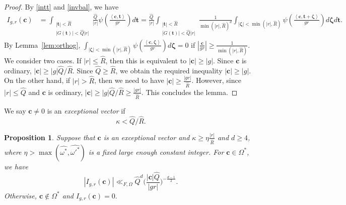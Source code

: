 \documentclass[10pt]{amsart}
\theoremstyle{plain}
\theoremstyle{plain}
\newtheorem{proposition}[theorem]{Proposition}
\renewcommand{\vec}[1]{\mathbf{#1}}
\theoremstyle{remark}
\theoremstyle{definition}
\renewcommand{\hat}{\widehat}
\newcommand{\hQ}{\widehat{Q}}
\newcommand{\hR}{\widehat{R}}
\begin{document}
\begin{proof}
By \eqref{intt} and  \eqref{invbal}, we have \begin{equation*}
\begin{split}
I_{g,r}(\vec{c})&=\int_{\substack{|\vec{t}| < \hR \\ |G(\vec{t})|< \hQ|r|}} \frac{\hQ}{|r|}  \psi\left(\frac{\left< \vec{c},\vec{t} \right>}{gr}    \right) d\vec{t}= \frac{\hQ}{|r|} \int_{\substack{|\vec{t}| < \hR \\ |G(\vec{t})|< \hQ|r|}} \frac{1}{\min(|r|,\hR)^d} \int_{|\boldsymbol\zeta|<  \min(|r|,\hR)}  \psi\left(\frac{\left< \vec{c},\vec{t}+\boldsymbol{\zeta} \right>}{gr}    \right) d\boldsymbol\zeta d\vec{t}.
\end{split}
\end{equation*}
By Lemma~\ref{lem:orthog},
\(
 \int_{|\boldsymbol\zeta|< \min(|r|,\hR)}  \psi\left(\frac{\left< \vec{c},\boldsymbol{\zeta} \right>}{gr}    \right) d\boldsymbol\zeta=0
\) 
if $\left|\frac{\vec{c}}{gr}\right|\geq\frac{1}{\min(|r|,\hR)}$. We consider two cases. If $|r|\leq\hR$, then this is equivalent to $|\vec{c}|\geq |g|$. Since $\vec{c}$ is ordinary, $|\vec{c}|\geq |g|\hQ/\hR$. Since $\hQ\geq \hR$, we obtain the required inequality $|\vec{c}|\geq |g|$. On the other hand, if $|r|>\hR$, then we need to have $|\vec{c}|\geq\frac{|gr|}{\hR}$. However, since $|r|\leq\hQ$ and $\vec{c}$ is ordinary, $|\vec{c}|\geq |g|\hQ/\hR\geq \frac{|gr|}{\hR}$. This concludes the lemma. 
\end{proof}
We say $\vec{c}\neq 0$ is an \textit{exceptional vector} if  
\begin{equation}\label{typeII}\kappa<  \hQ/\hR.\end{equation}

\begin{proposition}\label{c}
Suppose that $\vec{c}$ is an exceptional vector and $\kappa\geq  \eta \frac{|r|}{\hR}$ and $d\geq 4$, where   $\eta> \max(\hat{\omega^*}, \hat{\omega'^*})$ is a fixed large enough constant integer.  For $\vec{c}\in \Omega^*$, we have  
 \begin{equation}
\label{excep}
|I_{g,r}(\vec{c})|\ll_{F,\Omega}  \hQ^d\Big(\frac{|\vec{c}|\hQ}{|gr|}   \Big)^{-\frac{d-1}{2}}.
\end{equation}
Otherwise, $\vec{c}\notin \Omega^*$  and $I_{g,r}(\vec{c})=0.$
\end{proposition}
\end{document}
